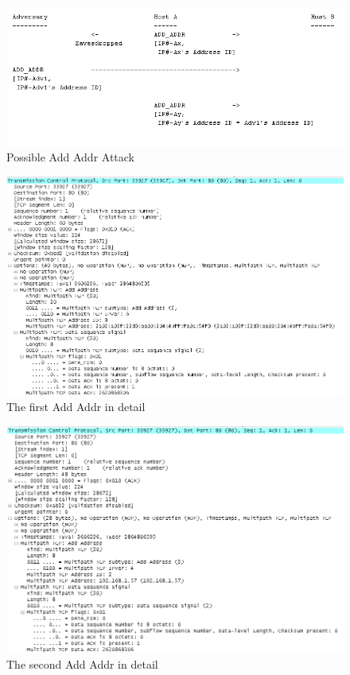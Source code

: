 \begin{figure}[!t]
\centering
\includegraphics[scale = 0.6]{Figures/addaddrattack.png}
\caption{Possible Add Addr Attack}
\label{pic:2 add attack}
\end{figure}

\begin{figure}[!t]
\centering
\includegraphics[scale = 0.75, angle = 90]{Figures/addaddr1.png}
\caption{The first Add Addr in detail}
\label{pic:2 adds detail1}
\end{figure}

\begin{figure}[!t]
\centering
\includegraphics[scale = 0.75, angle = 90]{Figures/addaddr2.png}
\caption{The second Add Addr in detail}
\label{pic:2 adds detail2}
\end{figure}



